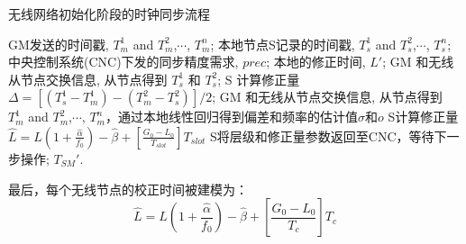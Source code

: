 \documentclass[UTF8,a4paper,12pt]{ctexart}
\numberwithin{equation}{section}
\begin{document}
	\begin{figure}[H]
	\end{figure}
	\begin{algorithm}[ht]  
		\caption{无线网络初始化阶段的时钟同步流程}  
		\begin{algorithmic}[1]
			\REQUIRE GM发送的时间戳, $T_m^1$ and $T_m^2$,$\cdots$, $T_m^n$; 本地节点S记录的时间戳, $T_s^1$ and $T_s^2$,$\cdots$, $T_s^n$; 中央控制系统(CNC)下发的同步精度需求, $prec$;
			\ENSURE 本地的修正时间, $L'$;
			\STATE GM 和无线从节点交换信息, 从节点得到 $T_s^1$ 和 $T_s^2$; 
			\STATE S 计算修正量 $\Delta = [(T_s^1 - T_m^1) - (T_m^2 - T_s^2)]/2$;
			\ELSE  
			\STATE GM 和无线从节点交换信息, 从节点得到 $T_m^1$ and $T_m^2$,$\cdots$, $T_m^n$，通过本地线性回归得到偏差和频率的估计值$\sigma$和$o$	
			\STATE S计算修正量$\widehat{L}=L(1+\frac{\widehat{\alpha}}{f_0})-\widehat{\beta}+[\frac{G_0-L_0}{T_{slot}}]T_{slot}$			
			\ENDIF
			\STATE S将层级和修正量参数返回至CNC，等待下一步操作;
			\ENDWHILE
			\ENDWHILE
			\RETURN $T_{SM}'$.
		\end{algorithmic}
	\end{algorithm}
	
	最后，每个无线节点的校正时间被建模为：
	\begin{equation}
		\widehat{L}=L\left(1+\frac{\widehat{\alpha}}{f_0}\right)-\widehat{\beta}+\left[\frac{G_0-L_0}{T_c}\right] T_c
	\end{equation}
	
\end{document}
